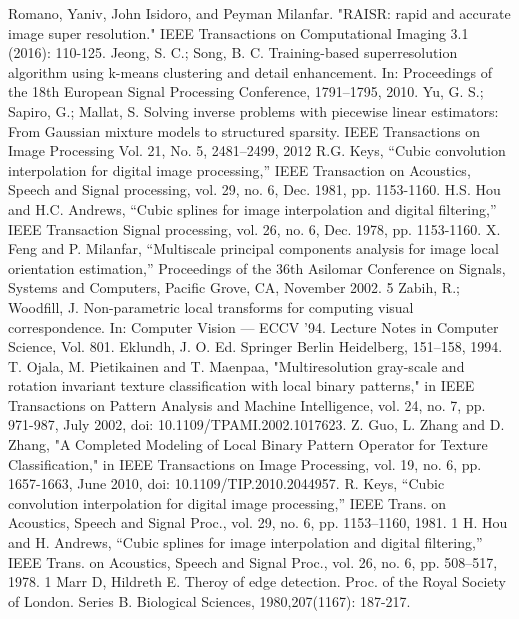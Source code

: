 \documentclass[12pt, a4paper, oneside]{ctexbook}
\begin{document}
	\newpage
	\begin{thebibliography}{99}
		Romano, Yaniv, John Isidoro, and Peyman Milanfar. "RAISR: rapid and accurate image super resolution." IEEE Transactions on Computational Imaging 3.1 (2016): 110-125.
		Jeong, S. C.; Song, B. C. Training-based superresolution algorithm using k-means clustering and detail enhancement. In: Proceedings of the 18th European Signal Processing Conference, 1791–1795, 2010.
		 Yu, G. S.; Sapiro, G.; Mallat, S. Solving inverse problems with piecewise linear estimators: From Gaussian mixture models to structured sparsity. IEEE Transactions on Image Processing Vol. 21, No. 5, 2481–2499, 2012
		R.G. Keys, “Cubic convolution interpolation for digital image processing,” IEEE Transaction on Acoustics, Speech and Signal processing, vol. 29, no. 6, Dec. 1981, pp. 1153-1160.
		H.S. Hou and H.C. Andrews, “Cubic splines for image interpolation and digital filtering,” IEEE Transaction Signal processing, vol. 26, no. 6, Dec. 1978, pp. 1153-1160.
		X. Feng and P. Milanfar, “Multiscale principal components analysis for image local orientation estimation,” Proceedings of the 36th Asilomar Conference on Signals, Systems and Computers, Pacific Grove, CA, November 2002. 5
		Zabih, R.; Woodfill, J. Non-parametric local transforms for computing visual correspondence. In: Computer Vision — ECCV ’94. Lecture Notes in Computer Science, Vol. 801. Eklundh, J. O. Ed. Springer Berlin Heidelberg, 151–158, 1994.
		T. Ojala, M. Pietikainen and T. Maenpaa, "Multiresolution gray-scale and rotation invariant texture classification with local binary patterns," in IEEE Transactions on Pattern Analysis and Machine Intelligence, vol. 24, no. 7, pp. 971-987, July 2002, doi: 10.1109/TPAMI.2002.1017623.
		Z. Guo, L. Zhang and D. Zhang, "A Completed Modeling of Local Binary Pattern Operator for Texture Classification," in IEEE Transactions on Image Processing, vol. 19, no. 6, pp. 1657-1663, June 2010, doi: 10.1109/TIP.2010.2044957.
		 R. Keys, “Cubic convolution interpolation for digital image processing,” IEEE Trans. on Acoustics, Speech and Signal Proc., vol. 29, no. 6, pp. 1153–1160, 1981. 1
		H. Hou and H. Andrews, “Cubic splines for image interpolation and digital filtering,” IEEE Trans. on Acoustics, Speech and Signal Proc., vol. 26, no. 6, pp. 508–517, 1978. 1
		Marr D, Hildreth E. Theroy of edge detection. Proc. of the Royal Society of London. Series B. Biological Sciences, 1980,207(1167): 187-217.
	\end{thebibliography}
	
	
\end{document}

